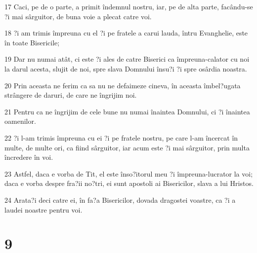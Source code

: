 \par 17 Caci, pe de o parte, a primit îndemnul nostru, iar, pe de alta parte, facându-se ?i mai sârguitor, de buna voie a plecat catre voi.
\par 18 ?i am trimis împreuna cu el ?i pe fratele a carui lauda, întru Evanghelie, este în toate Bisericile;
\par 19 Dar nu numai atât, ci este ?i ales de catre Biserici ca împreuna-calator cu noi la darul acesta, slujit de noi, spre slava Domnului însu?i ?i spre osârdia noastra.
\par 20 Prin aceasta ne ferim ca sa nu ne defaimeze cineva, în aceasta îmbel?ugata strângere de daruri, de care ne îngrijim noi.
\par 21 Pentru ca ne îngrijim de cele bune nu numai înaintea Domnului, ci ?i înaintea oamenilor.
\par 22 ?i l-am trimis împreuna cu ei ?i pe fratele nostru, pe care l-am încercat în multe, de multe ori, ca fiind sârguitor, iar acum este ?i mai sârguitor, prin multa încredere în voi.
\par 23 Astfel, daca e vorba de Tit, el este înso?itorul meu ?i împreuna-lucrator la voi; daca e vorba despre fra?ii no?tri, ei sunt apostoli ai Bisericilor, slava a lui Hristos.
\par 24 Arata?i deci catre ei, în fa?a Bisericilor, dovada dragostei voastre, ca ?i a laudei noastre pentru voi.

\chapter{9}

